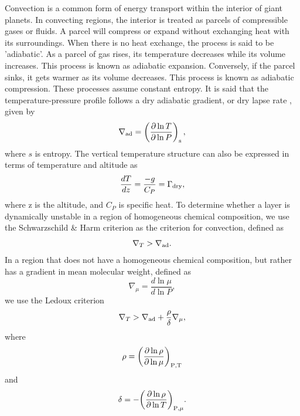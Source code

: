 \documentclass[11pt]{ucscthesisbs}
\begin{document}
Convection is a common form of energy transport within the interior of giant planets. In convecting regions, the interior is treated as parcels of compressible gases or fluids. A parcel will compress or expand without exchanging heat with its surroundings. When there is no heat exchange, the process is said to be 'adiabatic'. As a parcel of gas rises, its temperature decreases while its volume increases. This process is known as adiabatic expansion. Conversely, if the parcel sinks, it gets warmer as its volume decreases. This process is known as adiabatic compression. These processes assume constant entropy. It is said that the temperature-pressure profile follows a dry adiabatic gradient, or dry lapse rate \citep{kippenhahn_2012}, given by
\begin{equation}
  \nabla_{\rm ad} = \left( \frac{\partial \ln T}{\partial \ln P} \right)_{\rm s},
\end{equation}
where $s$ is entropy. The vertical temperature structure can also be expressed in terms of temperature and altitude \citep{sanchez-lavega} as
\begin{equation}
  \frac{dT}{dz} = \frac{-g}{C_{P}} = \Gamma_{\rm dry},
\end{equation}
where z is the altitude, and $C_{P}$ is specific heat. To determine whether a layer is dynamically unstable in a region of homogeneous chemical composition, we use the Schwarzschild \& Harm criterion \citep{kippenhahn_2012} as the criterion for convection, defined as
 \begin{equation}
  \nabla_{T} > \nabla_{\rm ad}.
\end{equation}
In a region that does not have a homogeneous chemical composition, but rather has a gradient in mean molecular weight, defined as
 \begin{equation}
 \nabla_{\mu} = \frac{d \ln \mu}{d \ln P}, 
\end{equation}
 we use the Ledoux criterion\citep{kippenhahn_2012}
\begin{equation}
  \nabla_{T} > \nabla_{\rm ad} + \frac{\rho}{\delta}\nabla_{\mu},
  \label{eq:ledoux}
\end{equation}
where
\begin{equation}
  \rho = \bigg(\frac{\partial \ln \rho}{\partial \ln \mu}\bigg)_{\rm P,T}
\end{equation}
and
\begin{equation}
 \delta = -\bigg(\frac{\partial \ln \rho}{\partial \ln T}\bigg)_{\rm P,\mu}.
\end{equation}
\end{document}
